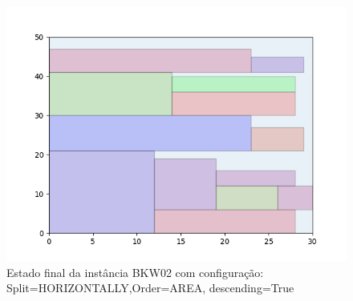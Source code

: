\begin{figure}[H]
    \centering
    \caption[]{Estado final da instância BKW02 com configuração: Split=HORIZONTALLY,Order=AREA, descending=True}
    \label{fig:bkw02-horizontally-area-true}
    \includegraphics[scale=0.5]{output/figures/bkw/bkw02/horizontally/area/true/00}
\end{figure}
